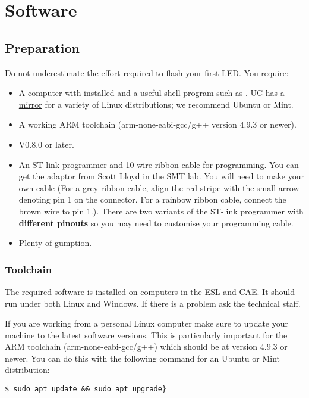 \chapter{Software}

\section{Preparation}
\label{preparation}

Do not underestimate the effort required to flash your first LED. You
require:

\begin{itemize}
\item
  A computer with  installed and a useful shell program such as
  . UC has a \href{http://ucmirror.canterbury.ac.nz/}{mirror}
  for a variety of Linux distributions; we recommend Ubuntu or Mint.
\item
  A working ARM toolchain (arm-none-eabi-gcc/g++ version 4.9.3 or newer).
\item
   V0.8.0 or later.
\item
  An ST-link programmer and 10-wire ribbon cable for programming. You
  can get the adaptor from Scott Lloyd in the SMT lab. You will need
  to make your own cable (For a grey ribbon cable, align the red
  stripe with the small arrow denoting pin 1 on the connector. For a
  rainbow ribbon cable, connect the brown wire to pin 1.). There are
  two variants of the ST-link programmer with \textbf{different
    pinouts} so you may need to customise your programming cable.
\item
  Plenty of gumption.
\end{itemize}

\subsection{Toolchain}
\label{toolchain}

The required software is installed on computers in the ESL and
CAE. It should run under both Linux and Windows. If there is a
problem ask the technical staff.

If you are working from a personal Linux computer make sure to update
your machine to the latest software versions. This is particularly
important for the ARM toolchain (arm-none-eabi-gcc/g++) which should be
at version 4.9.3 or newer. You can do this with the following command
for an Ubuntu or Mint distribution:

\begin{verbatim}
$ sudo apt update && sudo apt upgrade}
\end{verbatim}


